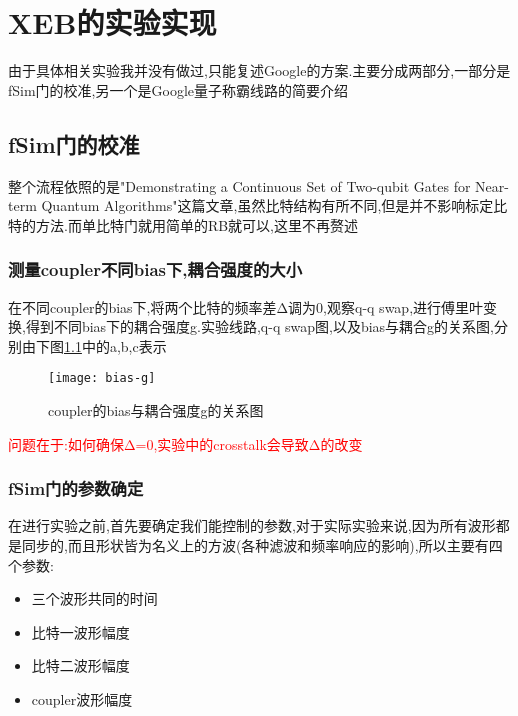 \chapter{XEB的实验实现}
由于具体相关实验我并没有做过,只能复述Google的方案.主要分成两部分,一部分是fSim门的校准,另一个是Google量子称霸线路的简要介绍
\section{fSim门的校准}
整个流程依照的是"Demonstrating a Continuous Set of Two-qubit Gates for Near-term Quantum Algorithms"这篇文章,虽然比特结构有所不同,但是并不影响标定比特的方法.而单比特门就用简单的RB就可以,这里不再赘述
\subsection{测量coupler不同bias下,耦合强度的大小}
在不同coupler的bias下,将两个比特的频率差Δ调为0,观察q-q swap,进行傅里叶变换,得到不同bias下的耦合强度g.实验线路,q-q swap图,以及bias与耦合g的关系图,分别由下图\ref{bias-g}中的a,b,c表示
\begin{figure}
	\centering
	\texttt{[image: bias-g]}
	\caption{coupler的bias与耦合强度g的关系图} 
	\label{bias-g}
\end{figure}

\textcolor{red}{问题在于:如何确保Δ=0,实验中的crosstalk会导致Δ的改变}
\subsection{fSim门的参数确定}
在进行实验之前,首先要确定我们能控制的参数,对于实际实验来说,因为所有波形都是同步的,而且形状皆为名义上的方波(各种滤波和频率响应的影响),所以主要有四个参数:
\begin{itemize}
	\item 三个波形共同的时间
	\item 比特一波形幅度
	\item 比特二波形幅度
	\item coupler波形幅度
\end{itemize}


